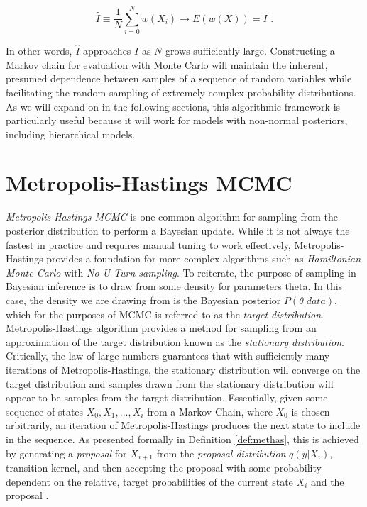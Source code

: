 \documentclass[
  12pt,
]{book}
\theoremstyle{definition}
\theoremstyle{definition}
\theoremstyle{definition}
\theoremstyle{remark}
\begin{document}
\[\hat{I}\equiv\frac{1}{N}\sum_{i=0}^{N}w(X_{i})\rightarrow E(w(X))=I \textrm{ .}\]

In other words, \(\hat{I}\) approaches \(I\) as \(N\) grows sufficiently large.
Constructing a Markov chain for evaluation with Monte Carlo will maintain the inherent, presumed dependence between samples of a sequence of random variables while facilitating the random sampling of extremely complex probability distributions.
As we will expand on in the following sections, this algorithmic framework is particularly useful because it will work for models with non-normal posteriors, including hierarchical models.

\hypertarget{metropolis-hastings-mcmc}{%
\section{Metropolis-Hastings MCMC}\label{metropolis-hastings-mcmc}}

\emph{Metropolis-Hastings MCMC} is one common algorithm for sampling from the posterior distribution to perform a Bayesian update.
While it is not always the fastest in practice and requires manual tuning to work effectively, Metropolis-Hastings provides a foundation for more complex algorithms such as \emph{Hamiltonian Monte Carlo} with \emph{No-U-Turn sampling}.
To reiterate, the purpose of sampling in Bayesian inference is to draw from some density for parameters theta.
In this case, the density we are drawing from is the Bayesian posterior \(P(\theta|data)\), which for the purposes of MCMC is referred to as the \emph{target distribution}.
Metropolis-Hastings algorithm provides a method for sampling from an approximation of the target distribution known as the \emph{stationary distribution}.
Critically, the law of large numbers guarantees that with sufficiently many iterations of Metropolis-Hastings, the stationary distribution will converge on the target distribution and samples drawn from the stationary distribution will appear to be samples from the target distribution.
Essentially, given some sequence of states \(X_{0},X_{1},...,X_{i}\) from a Markov-Chain, where \(X_{0}\) is chosen arbitrarily, an iteration of Metropolis-Hastings produces the next state to include in the sequence.
As presented formally in Definition \ref{def:methas}, this is achieved by generating a \emph{proposal} for \(X_{i+1}\) from the \emph{proposal distribution} \(q(y|X_{i})\), transition kernel, and then accepting the proposal with some probability dependent on the relative, target probabilities of the current state \(X_{i}\) and the proposal \citep{Wasserman2004}.
\end{document}
